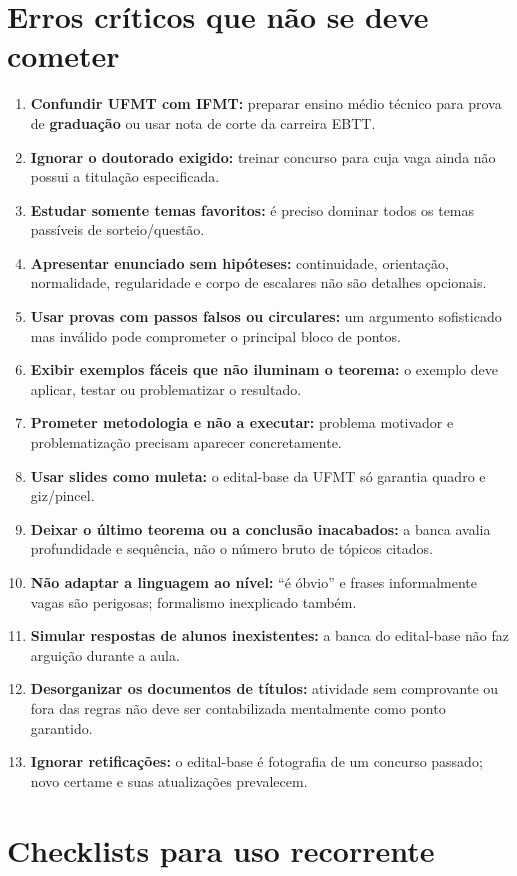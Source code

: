 \documentclass[11pt,a4paper]{article}
\begin{document}
\section{Erros críticos que não se deve cometer}
\begin{enumerate}
\item \textbf{Confundir UFMT com IFMT:} preparar ensino médio técnico para prova de \textbf{graduação} ou usar nota de corte da carreira EBTT.
\item \textbf{Ignorar o doutorado exigido:} treinar concurso para cuja vaga ainda não possui a titulação especificada.
\item \textbf{Estudar somente temas favoritos:} é preciso dominar todos os temas passíveis de sorteio/questão.
\item \textbf{Apresentar enunciado sem hipóteses:} continuidade, orientação, normalidade, regularidade e corpo de escalares não são detalhes opcionais.
\item \textbf{Usar provas com passos falsos ou circulares:} um argumento sofisticado mas inválido pode comprometer o principal bloco de pontos.
\item \textbf{Exibir exemplos fáceis que não iluminam o teorema:} o exemplo deve aplicar, testar ou problematizar o resultado.
\item \textbf{Prometer metodologia e não a executar:} problema motivador e problematização precisam aparecer concretamente.
\item \textbf{Usar slides como muleta:} o edital-base da UFMT só garantia quadro e giz/pincel.
\item \textbf{Deixar o último teorema ou a conclusão inacabados:} a banca avalia profundidade e sequência, não o número bruto de tópicos citados.
\item \textbf{Não adaptar a linguagem ao nível:} ``é óbvio'' e frases informalmente vagas são perigosas; formalismo inexplicado também.
\item \textbf{Simular respostas de alunos inexistentes:} a banca do edital-base não faz arguição durante a aula.
\item \textbf{Desorganizar os documentos de títulos:} atividade sem comprovante ou fora das regras não deve ser contabilizada mentalmente como ponto garantido.
\item \textbf{Ignorar retificações:} o edital-base é fotografia de um concurso passado; novo certame e suas atualizações prevalecem.
\end{enumerate}

\section{Checklists para uso recorrente}
\end{document}
